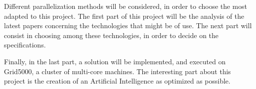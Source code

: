 Different parallelization methods will be considered, in order to choose the most adapted to this project.
The first part of this project will be the analysis of the latest papers concerning the technologies that might be of use.
The next part will consist in choosing among these technologies, in order to decide on the specifications.
\newline

Finally, in the last part, a solution will be implemented, and executed on Grid5000, a cluster of multi-core machines.
The interesting part about this project is the creation of an Artificial Intelligence as optimized as possible.


